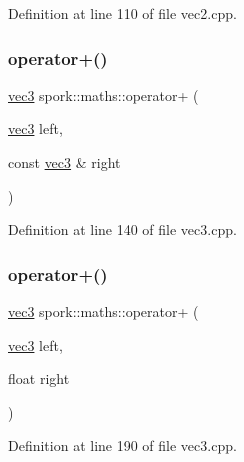 Definition at line 110 of file vec2.\+cpp.

\mbox{\label{namespacespork_1_1maths_af21cd7b96da7a52260534225958cda3c}} 
\subsubsection{\texorpdfstring{operator+()}{operator+()}\hspace{0.1cm}{\footnotesize\ttfamily [4/5]}}
{\footnotesize\ttfamily \hyperlink{structspork_1_1maths_1_1vec3}{vec3} spork\+::maths\+::operator+ (\begin{DoxyParamCaption}\item[{\hyperlink{structspork_1_1maths_1_1vec3}{vec3}}]{left,  }\item[{const \hyperlink{structspork_1_1maths_1_1vec3}{vec3} \&}]{right }\end{DoxyParamCaption})}



Definition at line 140 of file vec3.\+cpp.

\mbox{\label{namespacespork_1_1maths_abac5b30d5be3e3251f9fc2c1c351ebb7}} 
\subsubsection{\texorpdfstring{operator+()}{operator+()}\hspace{0.1cm}{\footnotesize\ttfamily [5/5]}}
{\footnotesize\ttfamily \hyperlink{structspork_1_1maths_1_1vec3}{vec3} spork\+::maths\+::operator+ (\begin{DoxyParamCaption}\item[{\hyperlink{structspork_1_1maths_1_1vec3}{vec3}}]{left,  }\item[{float}]{right }\end{DoxyParamCaption})}



Definition at line 190 of file vec3.\+cpp.

\mbox{\label{namespacespork_1_1maths_a89ebc59051b819b77bdca5c54469a2b8}} 
